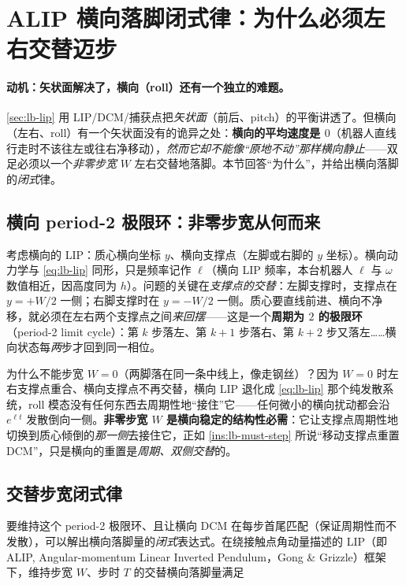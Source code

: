 \section{ALIP 横向落脚闭式律：为什么必须左右交替迈步}
\label{sec:lb-alip}

\paragraph{动机：矢状面解决了，横向（roll）还有一个独立的难题。}
\cref{sec:lb-lip} 用 LIP/DCM/捕获点把\emph{矢状面}（前后、pitch）的平衡讲透了。但横向（左右、roll）有一个矢状面没有的诡异之处：\textbf{横向的平均速度是 $0$}（机器人直线行走时不该往左或往右净移动），\emph{然而它却不能像“原地不动”那样横向静止}——双足必须以一个\emph{非零步宽} $W$ 左右交替地落脚。本节回答“为什么”，并给出横向落脚的\emph{闭式}律。

\subsection{横向 period-2 极限环：非零步宽从何而来}
\label{subsec:lb-lateral}

考虑横向的 LIP：质心横向坐标 $y$、横向支撑点（左脚或右脚的 $y$ 坐标）。横向动力学与 \cref{eq:lb-lip} 同形，只是频率记作 $\ell$（横向 LIP 频率，本台机器人 $\ell$ 与 $\omega$ 数值相近，因高度同为 $h$）。问题的关键在\emph{支撑点的交替}：左脚支撑时，支撑点在 $y=+W/2$ 一侧；右脚支撑时在 $y=-W/2$ 一侧。质心要直线前进、横向不净移，就必须在左右两个支撑点之间\emph{来回摆}——这是一个\textbf{周期为 $2$ 的极限环}（period-2 limit cycle）：第 $k$ 步落左、第 $k+1$ 步落右、第 $k+2$ 步又落左……横向状态每\emph{两}步才回到同一相位。

为什么不能步宽 $W=0$（两脚落在同一条中线上，像走钢丝）？因为 $W=0$ 时左右支撑点重合、横向支撑点不再交替，横向 LIP 退化成 \cref{eq:lb-lip} 那个纯发散系统，roll 模态没有任何东西去周期性地“接住”它——任何微小的横向扰动都会沿 $e^{\ell t}$ 发散倒向一侧。\textbf{非零步宽 $W$ 是横向稳定的结构性必需}：它让支撑点周期性地切换到质心倾倒的\emph{那一侧}去接住它，正如 \cref{ins:lb-must-step} 所说“移动支撑点重置 DCM”，只是横向的重置是\emph{周期、双侧交替}的。

\subsection{交替步宽闭式律}
\label{subsec:lb-alip-law}

要维持这个 period-2 极限环、且让横向 DCM 在每步首尾匹配（保证周期性而不发散），可以解出横向落脚量的\emph{闭式}表达式。在绕接触点角动量描述的 LIP（即 ALIP, Angular-momentum Linear Inverted Pendulum，Gong \& Grizzle\cite{gong2022alip}）框架下，维持步宽 $W$、步时 $T$ 的交替横向落脚量满足

